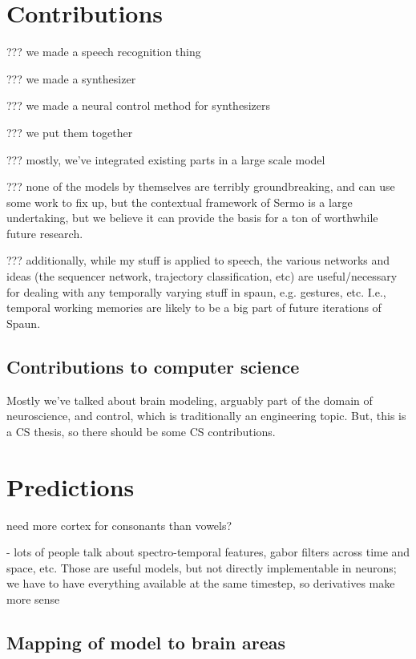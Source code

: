 \section{Contributions}

??? we made a speech recognition thing

??? we made a synthesizer

??? we made a neural control method for synthesizers

??? we put them together

??? mostly, we've integrated existing parts in a large scale model

??? none of the models by themselves are terribly groundbreaking,
and can use some work to fix up,
but the contextual framework of Sermo
is a large undertaking,
but we believe it can provide the basis
for a ton of worthwhile future research.

??? additionally, while my stuff is applied to speech,
the various networks and ideas (the sequencer network,
trajectory classification, etc) are useful/necessary
for dealing with any temporally varying stuff in spaun, e.g. gestures, etc.
I.e., temporal working memories are likely to be
a big part of future iterations of Spaun.

\subsection{Contributions to computer science}

Mostly we've talked about brain modeling,
arguably part of the domain of neuroscience,
and control, which is traditionally an engineering topic.
But, this is a CS thesis, so there should be some CS contributions.

\section{Predictions}

need more cortex for consonants than vowels?

- lots of people talk about spectro-temporal features,
  gabor filters across time and space, etc.
  Those are useful models, but not directly implementable
  in neurons; we have to have everything available at
  the same timestep, so derivatives make more sense

\subsection{Mapping of model to brain areas}

